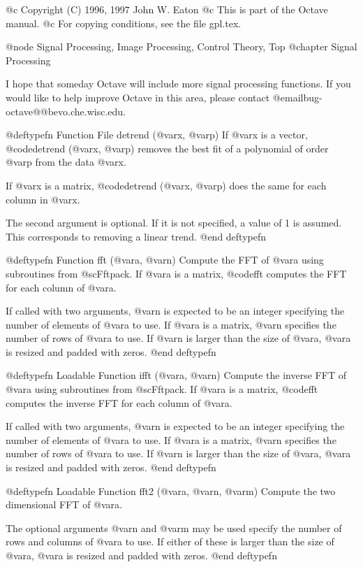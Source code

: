 @c Copyright (C) 1996, 1997 John W. Eaton
@c This is part of the Octave manual.
@c For copying conditions, see the file gpl.tex.

@node Signal Processing, Image Processing, Control Theory, Top
@chapter Signal Processing

I hope that someday Octave will include more signal processing
functions.  If you would like to help improve Octave in this area,
please contact @email{bug-octave@@bevo.che.wisc.edu}.

@deftypefn {Function File} {} detrend (@var{x}, @var{p})
If @var{x} is a vector, @code{detrend (@var{x}, @var{p})} removes the
best fit of a polynomial of order @var{p} from the data @var{x}.

If @var{x} is a matrix, @code{detrend (@var{x}, @var{p})} does the same
for each column in @var{x}.

The second argument is optional.  If it is not specified, a value of 1
is assumed.  This corresponds to removing a linear trend.
@end deftypefn

@deftypefn {Function} {} fft (@var{a}, @var{n})
Compute the FFT of @var{a} using subroutines from @sc{Fftpack}.  If @var{a}
is a matrix, @code{fft} computes the FFT for each column of @var{a}.

If called with two arguments, @var{n} is expected to be an integer
specifying the number of elements of @var{a} to use.  If @var{a} is a
matrix, @var{n} specifies the number of rows of @var{a} to use.  If
@var{n} is larger than the size of @var{a}, @var{a} is resized and
padded with zeros.
@end deftypefn

@deftypefn {Loadable Function} {} ifft (@var{a}, @var{n})
Compute the inverse FFT of @var{a} using subroutines from @sc{Fftpack}.  If
@var{a} is a matrix, @code{fft} computes the inverse FFT for each column
of @var{a}.

If called with two arguments, @var{n} is expected to be an integer
specifying the number of elements of @var{a} to use.  If @var{a} is a
matrix, @var{n} specifies the number of rows of @var{a} to use.  If
@var{n} is larger than the size of @var{a}, @var{a} is resized and
padded with zeros.
@end deftypefn

@deftypefn {Loadable Function} {} fft2 (@var{a}, @var{n}, @var{m})
Compute the two dimensional FFT of @var{a}.

The optional arguments @var{n} and @var{m} may be used specify the
number of rows and columns of @var{a} to use.  If either of these is
larger than the size of @var{a}, @var{a} is resized and padded with
zeros.
@end deftypefn

